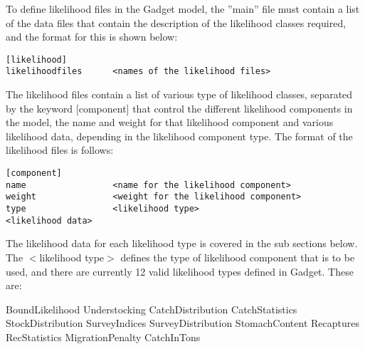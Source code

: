 \documentclass [a4paper, 10pt]{book}
\begin{document}
\bigskip
To define likelihood files in the Gadget model, the ''main'' file must contain a list of the data files that contain the description of the likelihood classes required, and the format for this is shown below:

{\small\begin{verbatim}
[likelihood]
likelihoodfiles      <names of the likelihood files>
\end{verbatim}}

The likelihood files contain a list of various type of likelihood classes, separated by the keyword [component] that control the different likelihood components in the model, the name and weight for that likelihood component and various likelihood data, depending in the likelihood component type.  The format of the likelihood files is follows:

{\small\begin{verbatim}
[component]
name                 <name for the likelihood component>
weight               <weight for the likelihood component>
type                 <likelihood type>
<likelihood data>
\end{verbatim}}

The likelihood data for each likelihood type is covered in the sub sections below.  The $<$likelihood type$>$ defines the type of likelihood component that is to be used, and there are currently 12 valid likelihood types defined in Gadget.  These are:

\bigskip
BoundLikelihood\newline
Understocking\newline
CatchDistribution\newline
CatchStatistics\newline
StockDistribution\newline
SurveyIndices\newline
SurveyDistribution\newline
StomachContent\newline
Recaptures\newline
RecStatistics\newline
MigrationPenalty\newline
CatchInTons
\end{document}
